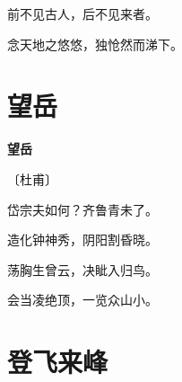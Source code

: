 \documentclass[12pt,UTF-8,openany,fontset=none]{ctexbook}
\begin{document}
    \vspace{18pt}  %

\begin{center}
    \begin{Large}

        前不见古人，后不见来者。

        念天地之悠悠，独怆然而涕下。

    \end{Large}

\end{center}

\vspace{8pt}
\clearpage

\section{望岳}


\begin{center}
    {\bfseries 望岳}

    \vspace{18pt}

    \begin{large}\xuwen
        〔杜甫〕
    \end{large}

\end{center}

    \vspace{18pt}  %

\begin{center}
    \begin{Large}

        岱宗夫如何？齐鲁青未了。

        造化钟神秀，阴阳割昏晓。

        荡胸生曾云，决眦入归鸟。

        会当凌绝顶，一览众山小。

    \end{Large}

\end{center}

\vspace{8pt}
\clearpage

\section{登飞来峰}

\end{document}
